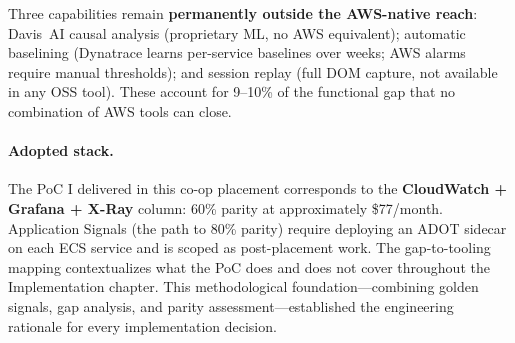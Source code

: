 \noindent
Three capabilities remain \textbf{permanently outside the AWS-native reach}:
Davis~AI causal analysis (proprietary ML, no AWS equivalent); automatic
baselining (Dynatrace learns per-service baselines over weeks; AWS alarms
require manual thresholds); and session replay (full DOM capture, not
available in any OSS tool). These account for 9--10\% of
the functional gap that no combination of AWS tools can close.

\paragraph{Adopted stack.}
The PoC I delivered in this co-op placement corresponds to the
\textbf{CloudWatch + Grafana + X-Ray} column: 60\% parity at approximately
\$77/month. Application Signals (the path to 80\% parity) require deploying
an ADOT sidecar on each ECS service and is scoped as post-placement work.
The gap-to-tooling mapping contextualizes what the PoC does and does not cover throughout the Implementation chapter. This methodological foundation---combining golden signals, gap analysis, and parity assessment---established the engineering rationale for every implementation decision.

\FloatBarrier